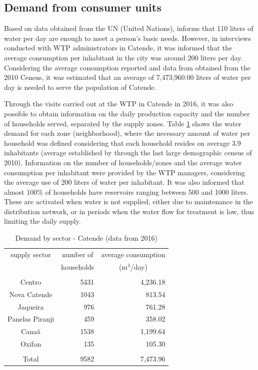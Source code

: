 \documentclass{singlecol}
\theoremstyle{TH}{
\newtheorem{lemma}{Lemma}
\newtheorem{theorem}[lemma]{Theorem}
\newtheorem{corrolary}[lemma]{Corrolary}
\newtheorem{conjecture}[lemma]{Conjecture}
\newtheorem{proposition}[lemma]{Proposition}
\newtheorem{claim}[lemma]{Claim}
\newtheorem{stheorem}[lemma]{Wrong Theorem}
\newtheorem{algorithm}{Algorithm}
}
\theoremstyle{THrm}{
\newtheorem{definition}{Definition}[section]
\newtheorem{question}{Question}[section]
\newtheorem{remark}{Remark}
\newtheorem{scheme}{Scheme}
}
\theoremstyle{THhit}{
\newtheorem{case}{Case}[section]
}
\begin{document}
\subsection{Demand from consumer units}

Based on data obtained from the UN (United Nations), \cite{Paganine2013} informs that 110 liters of water per day are enough to meet a person's basic needs. However, in interviews conducted with WTP administrators in Catende, it was informed that the average consumption per inhabitant in the city was around 200 liters per day. Considering the average consumption reported and data from \cite{IBGECatende} obtained from the 2010 Census, it was estimated that an average of 7,473,960.00 liters of water per day is needed to serve the population of Catende. 

Through the visits carried out at the WTP in Catende in 2016, it was also possible to obtain information on the daily production capacity and the number of households served, separated by the supply zones. Table \ref{tab:SectorsCatende} shows the water demand for each zone (neighborhood), where the necessary amount of water per household was defined considering that each household resides on average 3.9 inhabitants (average established by \cite{IBGECatende} through the last large demographic census of 2010). Information on the number of households/zones and the average water consumption per inhabitant were provided by the WTP managers, considering the average use of 200 liters of water per inhabitant. It was also informed that almost 100\% of households have reservoirs ranging between 500 and 1000 liters. These are activated when water is not supplied, either due to maintenance in the distribution network, or in periods when the water flow for treatment is low, thus limiting the daily supply. 

\begin{table}[H]
\begin{center}
	\begin{tabular}{ c  r  r } 
		supply sector       &  \multicolumn{1}{c}{number of}     &   \multicolumn{1}{c}{average consumption}  \\
		                    &  \multicolumn{1}{c}{households}    &  \multicolumn{1}{c}{($\mathrm{m^3}$/day)}   \\
		\\
		Centro              & 5431          &  4,236.18 \\
		Nova Catende        & 1043 	   &    813.54  \\
		Jaqueira            &  976          &    761.28 \\
		Panelas Piranji     &  459          &   358.02 \\
		Canaã               & 1538          &  1,199.64 \\
		Oxifan              &  135          &   105.30 \\
		\\
		Total               & 9582          &  7,473.96 \\
		\hline
	\end{tabular}
\caption{Demand by sector - Catende (data from 2016)}
\label{tab:SectorsCatende}
\end{center}
\end{table}
\end{document}
